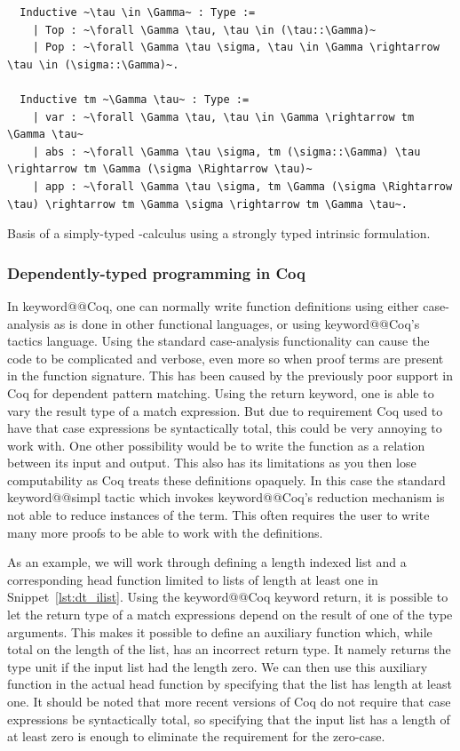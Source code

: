 \documentclass[11pt, final]{article}
\makeatletter
\def\<#1>{\csname keyword@@#1\endcsname}
\makeatother
\begin{document}
\begin{listing}[h]
  \begin{verbatim}
  Inductive ~\tau \in \Gamma~ : Type :=
    | Top : ~\forall \Gamma \tau, \tau \in (\tau::\Gamma)~
    | Pop : ~\forall \Gamma \tau \sigma, \tau \in \Gamma \rightarrow \tau \in (\sigma::\Gamma)~.

  Inductive tm ~\Gamma \tau~ : Type :=
    | var : ~\forall \Gamma \tau, \tau \in \Gamma \rightarrow tm \Gamma \tau~
    | abs : ~\forall \Gamma \tau \sigma, tm (\sigma::\Gamma) \tau \rightarrow tm \Gamma (\sigma \Rightarrow \tau)~
    | app : ~\forall \Gamma \tau \sigma, tm \Gamma (\sigma \Rightarrow \tau) \rightarrow tm \Gamma \sigma \rightarrow tm \Gamma \tau~.
  \end{verbatim}
  \caption{Basis of a simply-typed \lambda-calculus using a strongly typed intrinsic formulation.}
  \label{lst:strong_stlc}
\end{listing}


\subsubsection{Dependently-typed programming in Coq}

In \<Coq>, one can normally write function definitions using either case-analysis as is done in other functional languages, or using \<Coq>'s tactics language.
Using the standard case-analysis functionality can cause the code to be complicated and verbose, even more so when proof terms are present in the function signature.
This has been caused by the previously poor support in Coq for dependent pattern matching.
Using the return keyword, one is able to vary the result type of a match expression. But due to requirement Coq used to have that case expressions be syntactically total, this could be very annoying to work with.
One other possibility would be to write the function as a relation between its input and output.
This also has its limitations as you then lose computability as Coq treats these definitions opaquely. In this case the standard \<simpl> tactic which invokes \<Coq>'s reduction mechanism is not able to reduce instances of the term.
This often requires the user to write many more proofs to be able to work with the definitions.

As an example, we will work through defining a length indexed list and a corresponding head function limited to lists of length at least one in Snippet~\ref{lst:dt_ilist}.
Using the \<Coq> keyword return, it is possible to let the return type of a match expressions depend on the result of one of the type arguments.
This makes it possible to define an auxiliary function which, while total on the length of the list, has an incorrect return type. It namely returns the type unit if the input list had the length zero.
We can then use this auxiliary function in the actual head function by specifying that the list has length at least one.
It should be noted that more recent versions of Coq do not require that case expressions be syntactically total, so specifying that the input list has a length of at least zero is enough to eliminate the requirement for the zero-case.
\end{document}
